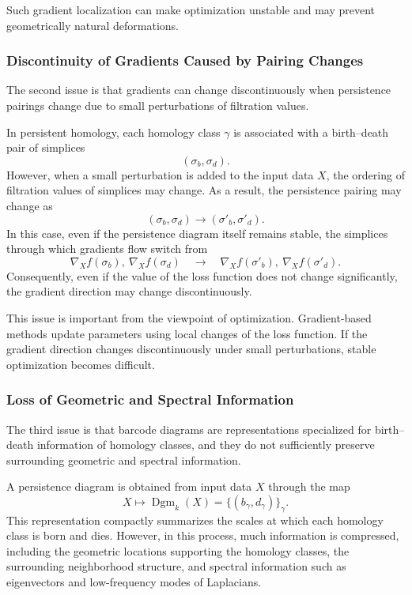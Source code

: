 \documentclass[pdflatex,sn-mathphys-ay]{sn-jnl}%
\theoremstyle{thmstyleone}%
\theoremstyle{thmstyletwo}%
\theoremstyle{thmstylethree}%
\begin{document}
Such gradient localization can make optimization unstable and may prevent geometrically natural deformations.

\subsubsection{Discontinuity of Gradients Caused by Pairing Changes}

The second issue is that gradients can change discontinuously when persistence pairings change due to small perturbations of filtration values.

In persistent homology, each homology class \(\gamma\) is associated with a birth--death pair of simplices
\[
(\sigma_b,\sigma_d).
\]
However, when a small perturbation is added to the input data \(X\), the ordering of filtration values of simplices may change.
As a result, the persistence pairing may change as
\[
(\sigma_b,\sigma_d)
\longrightarrow
(\sigma'_b,\sigma'_d).
\]
In this case, even if the persistence diagram itself remains stable, the simplices through which gradients flow switch from
\[
\nabla_X f(\sigma_b),
~
\nabla_X f(\sigma_d)\quad
\longrightarrow\quad
\nabla_X f(\sigma'_b),
~
\nabla_X f(\sigma'_d).
\]
Consequently, even if the value of the loss function does not change significantly, the gradient direction may change discontinuously.

This issue is important from the viewpoint of optimization.
Gradient-based methods update parameters using local changes of the loss function.
If the gradient direction changes discontinuously under small perturbations, stable optimization becomes difficult.

\subsubsection{Loss of Geometric and Spectral Information}

The third issue is that barcode diagrams are representations specialized for birth--death information of homology classes, and they do not sufficiently preserve surrounding geometric and spectral information.

A persistence diagram is obtained from input data \(X\) through the map
\[
X
\longmapsto
\operatorname{Dgm}_k(X)
=
\{(b_{\gamma},d_{\gamma})\}_{\gamma}.
\]
This representation compactly summarizes the scales at which each homology class is born and dies.
However, in this process, much information is compressed, including the geometric locations supporting the homology classes, the surrounding neighborhood structure, and spectral information such as eigenvectors and low-frequency modes of Laplacians.
\end{document}
